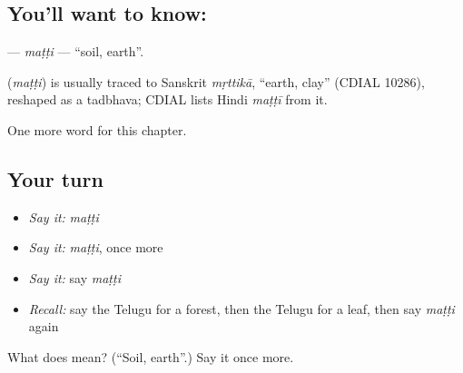\subsection*{You'll want to know: }
\textbf{} — \emph{maṭṭi} — \textquotedblleft{}soil, earth\textquotedblright{}.

\begin{cousinweb}
\textbf{} (\emph{maṭṭi}) is usually traced to Sanskrit \emph{mṛttikā}, \textquotedblleft{}earth, clay\textquotedblright{} (CDIAL 10286), reshaped as a tadbhava; CDIAL lists Hindi \emph{maṭṭī} from it.
\end{cousinweb}

\begin{grammarlens}[title={What you've built}]
One more word for this chapter.
\end{grammarlens}

\subsection*{Your turn}
\begin{itemize}
\raggedright
  \item \emph{Say it:} \emph{maṭṭi}
  \item \emph{Say it:} \emph{maṭṭi}, once more
  \item \emph{Say it:} say \emph{maṭṭi}
  \item \emph{Recall:} say the Telugu for a forest, then the Telugu for a leaf, then say \emph{maṭṭi} again
\end{itemize}

\begin{tcolorbox}[breakable,colback=teal!4,colframe=teal!35!black,title={Before you move on}]
What does  mean? (\textquotedblleft{}Soil, earth\textquotedblright{}.) Say it once more.
\end{tcolorbox}

